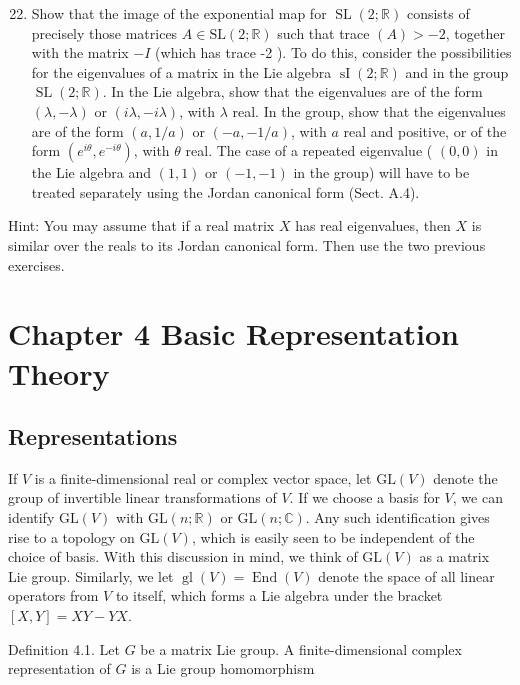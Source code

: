 \documentclass[10pt, letterpaper]{article}
\begin{document}
\begin{enumerate}
  \setcounter{enumi}{21}
  \item Show that the image of the exponential map for $\operatorname{SL}(2 ; \mathbb{R})$ consists of precisely those matrices $A \in \mathrm{SL}(2 ; \mathbb{R})$ such that trace $(A)>-2$, together with the matrix $-I$ (which has trace -2 ). To do this, consider the possibilities for the eigenvalues of a matrix in the Lie algebra $\operatorname{sI}(2 ; \mathbb{R})$ and in the group $\operatorname{SL}(2 ; \mathbb{R})$. In the Lie algebra, show that the eigenvalues are of the form $(\lambda,-\lambda)$ or $(i \lambda,-i \lambda)$, with $\lambda$ real. In the group, show that the eigenvalues are of the form $(a, 1 / a)$ or $(-a,-1 / a)$, with $a$ real and positive, or of the form $\left(e^{i \theta}, e^{-i \theta}\right)$, with $\theta$ real. The case of a repeated eigenvalue ( $(0,0)$ in the Lie algebra and $(1,1)$ or $(-1,-1)$ in the group) will have to be treated separately using the Jordan canonical form (Sect. A.4).
\end{enumerate}

Hint: You may assume that if a real matrix $X$ has real eigenvalues, then $X$ is similar over the reals to its Jordan canonical form. Then use the two previous exercises.

\section*{Chapter 4 Basic Representation Theory}
\subsection*{Representations}
If $V$ is a finite-dimensional real or complex vector space, let $\mathrm{GL}(V)$ denote the group of invertible linear transformations of $V$. If we choose a basis for $V$, we can identify $\mathrm{GL}(V)$ with $\mathrm{GL}(n ; \mathbb{R})$ or $\mathrm{GL}(n ; \mathbb{C})$. Any such identification gives rise to a topology on $\mathrm{GL}(V)$, which is easily seen to be independent of the choice of basis. With this discussion in mind, we think of $\mathrm{GL}(V)$ as a matrix Lie group. Similarly, we let $\operatorname{gl}(V)=\operatorname{End}(V)$ denote the space of all linear operators from $V$ to itself, which forms a Lie algebra under the bracket $[X, Y]=X Y-Y X$.

Definition 4.1. Let $G$ be a matrix Lie group. A finite-dimensional complex representation of $G$ is a Lie group homomorphism
\end{document}
